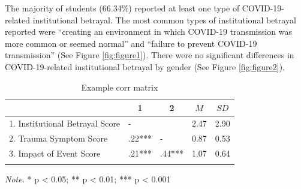 \documentclass[
  english,
  man,draftall]{apa6}
\begin{document}
The majority of students (66.34\%) reported at least one type of COVID-19-related institutional betrayal. The most common types of institutional betrayal reported were \enquote{creating an environment in which COVID-19 transmission was more common or seemed normal} and \enquote{failure to prevent COVID-19 transmission} (See Figure \ref{fig:figure1}). There were no significant differences in COVID-19-related institutional betrayal by gender (See Figure \ref{fig:figure2}).

\begin{table}[tbp]

\begin{center}
\begin{threeparttable}

\caption{\label{tab:table1}Example corr matrix}

\begin{tabular}{lllll}
\toprule
 & \multicolumn{1}{c}{1} & \multicolumn{1}{c}{2} & \multicolumn{1}{c}{$M$} & \multicolumn{1}{c}{$SD$}\\
\midrule
1. Institutional Betrayal Score & - &  & 2.47 & 2.90\\
2. Trauma Symptom Score & .22*** & - & 0.87 & 0.53\\
3. Impact of Event Score & .21*** & .44*** & 1.07 & 0.64\\
\bottomrule
\addlinespace
\end{tabular}

\begin{tablenotes}[para]
\normalsize{\textit{Note.} * p < 0.05; ** p < 0.01; *** p < 0.001}
\end{tablenotes}

\end{threeparttable}
\end{center}

\end{table}
\end{document}
